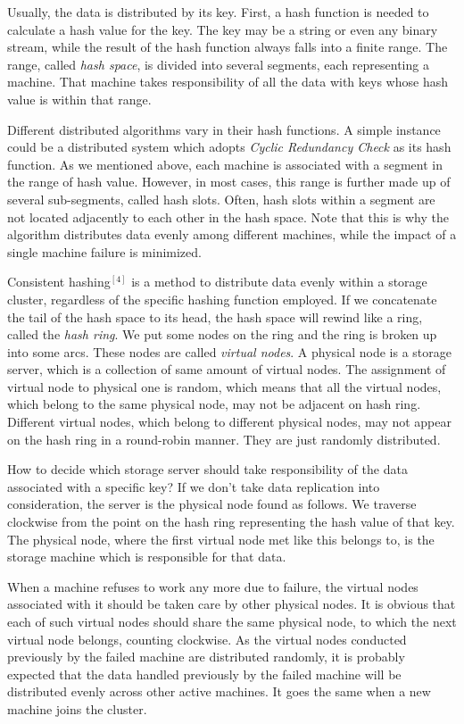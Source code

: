 Usually, the data is distributed by its key. First, a hash function is needed
to calculate a hash value for the key. The key may be a string or even any
binary stream, while the result of the hash function always falls into a
finite range. The range, called \emph{hash space}, is divided into several
segments, each representing a machine. That machine takes responsibility of
all the data with keys whose hash value is within that range.

Different distributed algorithms vary in their hash functions. A simple
instance could be a distributed system which adopts \emph{Cyclic Redundancy
Check} as its hash function. As we mentioned above, each machine is associated
with a segment in the range of hash value. However, in most cases, this range
is further made up of several sub-segments, called hash slots. Often, hash
slots within a segment are not located adjacently to each other in the hash
space. Note that this is why the algorithm distributes data evenly among
different machines, while the impact of a single machine failure is minimized.

Consistent hashing$^{[4]}$ is a method to distribute data evenly within a
storage cluster, regardless of the specific hashing function employed. If we
concatenate the tail of the hash space to its head, the hash space will rewind
like a ring, called the \emph{hash ring}. We put some nodes on the ring and
the ring is broken up into some arcs. These nodes are called \emph{virtual
nodes}. A physical node is a storage server, which is a collection of same
amount of virtual nodes. The assignment of virtual node to physical one is
random, which means that all the virtual nodes, which belong to the same
physical node, may not be adjacent on hash ring. Different virtual nodes,
which belong to different physical nodes, may not appear on the hash ring in a
round-robin manner. They are just randomly distributed.
    
How to decide which storage server should take responsibility of the data
associated with a specific key? If we don't take data replication into
consideration, the server is the physical node found as follows. We traverse
clockwise from the point on the hash ring representing the hash value of that
key. The physical node, where the first virtual node met like this belongs to,
is the storage machine which is responsible for that data.

When a machine refuses to work any more due to failure, the virtual nodes
associated with it should be taken care by other physical nodes. It is obvious
that each of such virtual nodes should share the same physical node, to which
the next virtual node belongs, counting clockwise. As the virtual nodes
conducted previously by the failed machine are distributed randomly, it is
probably expected that the data handled previously by the failed machine will
be distributed evenly across other active machines. It goes the same when a
new machine joins the cluster.

